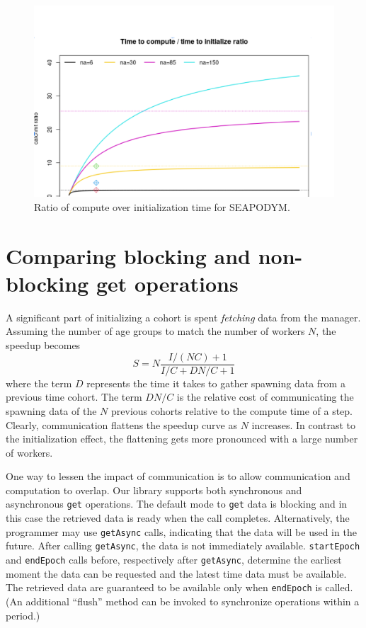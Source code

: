 \documentclass[a4paper,oneside,12pt]{article}
\begin{document}
\begin{figure}
    \includegraphics[width=15cm]{c2i.png}
    \caption{Ratio of compute over initialization time for SEAPODYM.}
    \label{fig:c2i}
\end{figure}

\section{Comparing blocking and non-blocking get operations}

A significant part of initializing a cohort is spent {\it fetching} data from the manager. Assuming the number of age groups 
to match the number of workers $N$, the speedup becomes 
\begin{equation}
    S = N \frac{I/(NC) + 1}{I/C + D N/C + 1}
\end{equation}
where the term $D$ represents the time it takes to gather spawning data from a previous time cohort. The term
$D N/C$ is the relative cost of communicating the spawning data of the $N$ previous cohorts relative to the compute time of 
a step. Clearly, communication flattens the speedup curve as $N$ increases. In contrast to the initialization
effect, the flattening gets more pronounced with a large number of workers.

One way to lessen the impact of communication is to allow communication and computation to overlap. 
Our library supports both synchronous and asynchronous \verb|get| operations. The default mode to \verb|get| data is blocking 
and in this case the retrieved data is ready when the call
completes. Alternatively, the programmer may use \verb|getAsync| calls, indicating that the data will be used in the future. After calling
\verb|getAsync|, the data is not immediately available. \verb|startEpoch|
and \verb|endEpoch| calls before, respectively after \verb|getAsync|, determine the earliest moment the data can be requested and the latest 
time data must be available. The retrieved data are guaranteed to be available only when
\verb|endEpoch| is called. (An additional ``flush'' method can be invoked
to synchronize operations within a period.)
\end{document}
